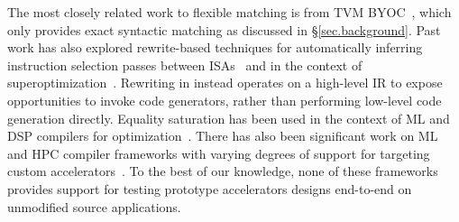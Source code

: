 The most closely related work to flexible matching is from 
   TVM BYOC~\cite{chen2021byoc}, which only provides exact syntactic matching as discussed in \S\ref{sec.background}.
Past work has also explored rewrite-based techniques for
  automatically inferring instruction selection passes
  between ISAs~\cite{
    ramsey2011resourceable,
    dias2010automatically}
  and in the context of superoptimization~\cite{
    bonsal-so,
    bonsal-so-translate}.
Rewriting in \TLA instead operates on a high-level IR
  to expose opportunities to invoke code generators,
  rather than performing low-level code generation directly.
Equality saturation has been
  used in the context of
  ML and DSP compilers for
  optimization~\cite{
    yang2021equality,
    alexa-dsp-eqsat,
    caviar-cc22}.
There has also been significant work on
  ML and HPC compiler frameworks with
  varying degrees of support for
  targeting custom accelerators~\cite{
    ragan2013halide,
    AtlPopl22,
    chen2018tvm,
    moreau2019hardware,
    lattner2021mlir}.
To the best of our knowledge,
  none of these frameworks provides support for
  testing prototype accelerators
  designs end-to-end on
  unmodified source applications.
  



